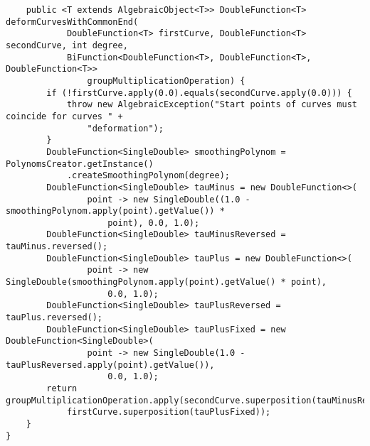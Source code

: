 \begin{verbatim}
    public <T extends AlgebraicObject<T>> DoubleFunction<T> deformCurvesWithCommonEnd(
            DoubleFunction<T> firstCurve, DoubleFunction<T> secondCurve, int degree,
            BiFunction<DoubleFunction<T>, DoubleFunction<T>, DoubleFunction<T>>
                groupMultiplicationOperation) {
        if (!firstCurve.apply(0.0).equals(secondCurve.apply(0.0))) {
            throw new AlgebraicException("Start points of curves must coincide for curves " +
                "deformation");
        }
        DoubleFunction<SingleDouble> smoothingPolynom = PolynomsCreator.getInstance()
            .createSmoothingPolynom(degree);
        DoubleFunction<SingleDouble> tauMinus = new DoubleFunction<>(
                point -> new SingleDouble((1.0 - smoothingPolynom.apply(point).getValue()) *
                    point), 0.0, 1.0);
        DoubleFunction<SingleDouble> tauMinusReversed = tauMinus.reversed();
        DoubleFunction<SingleDouble> tauPlus = new DoubleFunction<>(
                point -> new SingleDouble(smoothingPolynom.apply(point).getValue() * point),
                    0.0, 1.0);
        DoubleFunction<SingleDouble> tauPlusReversed = tauPlus.reversed();
        DoubleFunction<SingleDouble> tauPlusFixed = new DoubleFunction<SingleDouble>(
                point -> new SingleDouble(1.0 - tauPlusReversed.apply(point).getValue()),
                    0.0, 1.0);
        return groupMultiplicationOperation.apply(secondCurve.superposition(tauMinusReversed),
            firstCurve.superposition(tauPlusFixed));
    }
}
\end{verbatim}

